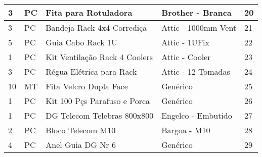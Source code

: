 \begin{table}[h!]
\begin{tabular}{|l|l|l|l|l|}
3   & PC   & Fita para Rotuladora          & Brother - Branca        & 20   \\ \hline
3   & PC   & Bandeja Rack 4x4 Corrediça    & Attic - 1000mm Vent     & 21   \\ \hline
5   & PC   & Guia Cabo Rack 1U             & Attic - 1UFix           & 22   \\ \hline
1   & PC   & Kit Ventilação Rack 4 Coolers & Attic - Cooler          & 23   \\ \hline
3   & PC   & Régua Elétrica para Rack      & Attic - 12 Tomadas      & 24   \\ \hline
10  & MT   & Fita Velcro Dupla Face        & Genérico                & 25   \\ \hline
1   & PC   & Kit 100 Pçs Parafuso e Porca  & Genérico                & 26   \\ \hline
1   & PC   & DG Telecom Telebras 800x800   & Engelco - Embutido      & 27   \\ \hline
2   & PC   & Bloco Telecom M10             & Bargoa - M10            & 28   \\ \hline
4   & PC   & Anel Guia DG Nr 6             & Genérico                & 29   \\ \hline
\end{tabular}
\end{table}